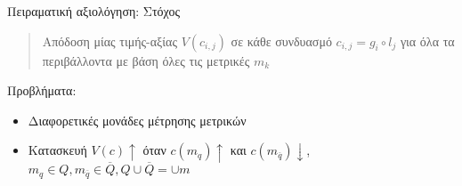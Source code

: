 \begin{frame}{Πειραματική αξιολόγηση: Στόχος}

  \begin{bw_box}
  \begin{quote}
    Απόδοση μίας τιμής-αξίας $V(c_{i,j})$ σε κάθε συνδυασμό $c_{i,j} = g_i \circ l_j$ για όλα τα περιβάλλοντα με βάση όλες τις μετρικές $m_k$
  \end{quote}
  \end{bw_box}

  \vspace{1cm}

  Προβλήματα:
  \begin{itemize}
    \item Διαφορετικές μονάδες μέτρησης μετρικών
    \item Κατασκευή $V(c) \uparrow$ όταν $c(m_q) \uparrow$ και $c(m_{\overline{q}})\downarrow$, \hspace{0.5cm} $m_q \in Q, m_{\overline{q}} \in \overline{Q}, Q \cup \overline{Q} = \cup m$
  \end{itemize}

\end{frame}
